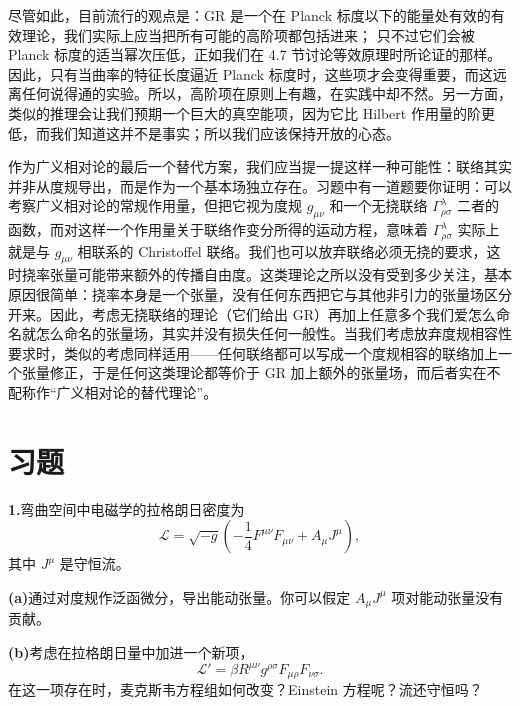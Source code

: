 尽管如此，目前流行的观点是：GR 是一个在 Planck 标度以下的能量处有效的有效理论，我们实际上应当把所有可能的高阶项都包括进来；
只不过它们会被 Planck 标度的适当幂次压低，正如我们在 4.7 节讨论等效原理时所论证的那样。因此，只有当曲率的特征长度逼近 Planck 标度时，这些项才会变得重要，而这远离任何说得通的实验。所以，高阶项在原则上有趣，在实践中却不然。另一方面，类似的推理会让我们预期一个巨大的真空能项，因为它比 Hilbert 作用量的阶更低，而我们知道这并不是事实；所以我们应该保持开放的心态。

作为广义相对论的最后一个替代方案，我们应当提一提这样一种可能性：联络其实并非从度规导出，而是作为一个基本场独立存在。习题中有一道题要你证明：可以考察广义相对论的常规作用量，但把它视为度规 $g_{\mu\nu}$ 和一个无挠联络 $\Gamma^{\lambda}_{\rho\sigma}$ 二者的函数，而对这样一个作用量关于联络作变分所得的运动方程，意味着 $\Gamma^{\lambda}_{\rho\sigma}$ 实际上就是与 $g_{\mu\nu}$ 相联系的 Christoffel 联络。我们也可以放弃联络必须无挠的要求，这时挠率张量可能带来额外的传播自由度。这类理论之所以没有受到多少关注，基本原因很简单：挠率本身是一个张量，没有任何东西把它与其他非引力的张量场区分开来。因此，考虑无挠联络的理论（它们给出 GR）再加上任意多个我们爱怎么命名就怎么命名的张量场，其实并没有损失任何一般性。当我们考虑放弃度规相容性要求时，类似的考虑同样适用——任何联络都可以写成一个度规相容的联络加上一个张量修正，于是任何这类理论都等价于 GR 加上额外的张量场，而后者实在不配称作“广义相对论的替代理论”。

\section{习题}

\textbf{1.}\quad 弯曲空间中电磁学的拉格朗日密度为
\begin{equation*}
\mathcal{L} = \sqrt{-g}\left(-\frac{1}{4}F^{\mu\nu}F_{\mu\nu} + A_{\mu}J^{\mu}\right),
\tag{4.156}
\end{equation*}
其中 $J^{\mu}$ 是守恒流。

\textbf{(a)}\quad 通过对度规作泛函微分，导出能动张量。你可以假定 $A_{\mu}J^{\mu}$ 项对能动张量没有贡献。

\textbf{(b)}\quad 考虑在拉格朗日量中加进一个新项，
\begin{equation*}
\mathcal{L}' = \beta R^{\mu\nu}g^{\rho\sigma}F_{\mu\rho}F_{\nu\sigma}.
\end{equation*}
在这一项存在时，麦克斯韦方程组如何改变？Einstein 方程呢？流还守恒吗？

